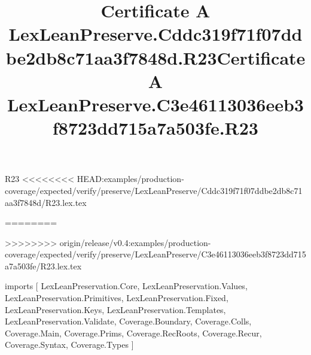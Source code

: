 \begin{lexlean}{R23}
<<<<<<<< HEAD:examples/production-coverage/expected/verify/preserve/LexLeanPreserve/Cddc319f71f07ddbe2db8c71aa3f7848d/R23.lex.tex
\title{Certificate A LexLeanPreserve.Cddc319f71f07ddbe2db8c71aa3f7848d.R23}
========
\title{Certificate A LexLeanPreserve.C3e46113036eeb3f8723dd715a7a503fe.R23}
>>>>>>>> origin/release/v0.4:examples/production-coverage/expected/verify/preserve/LexLeanPreserve/C3e46113036eeb3f8723dd715a7a503fe/R23.lex.tex
\begin{coremodule}
imports [
  LexLeanPreservation.Core,
  LexLeanPreservation.Values,
  LexLeanPreservation.Primitives,
  LexLeanPreservation.Fixed,
  LexLeanPreservation.Keys,
  LexLeanPreservation.Templates,
  LexLeanPreservation.Validate,
  Coverage.Boundary,
  Coverage.Colls,
  Coverage.Main,
  Coverage.Prims,
  Coverage.RecRoots,
  Coverage.Recur,
  Coverage.Syntax,
  Coverage.Types
]


\end{coremodule}
\end{lexlean}
